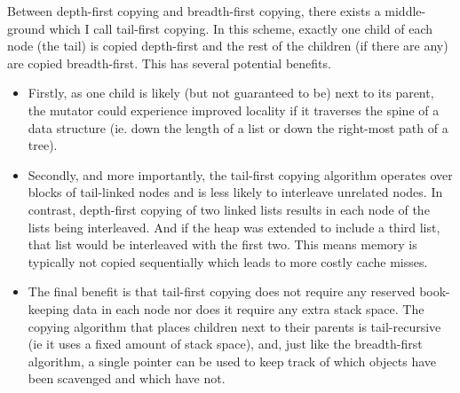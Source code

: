 \documentclass[a4paper,oneside]{memoir}
\begin{document}
Between depth-first copying and breadth-first copying, there exists a middle-ground
which I call tail-first copying. In this scheme, exactly one child of each node
(the tail) is copied depth-first and the rest of the children (if there are any)
are copied breadth-first. This has several potential benefits.
\begin{itemize}
  \item
  Firstly, as one
  child is likely (but not guaranteed to be) next to its parent, the mutator could
  experience improved locality if it traverses the spine of a data structure (ie.
  down the length of a list or down the right-most path of a tree).
  \item
  Secondly, and
  more importantly, the tail-first copying algorithm operates over blocks of
  tail-linked nodes and is less likely to interleave unrelated nodes. In contrast,
  depth-first copying of two linked lists results in each node of the lists being
  interleaved. And if the heap was extended to include a third list, that list
  would be interleaved with the first two. This means memory is typically not
  copied sequentially which leads to more costly cache misses.
  \item
  The final benefit
  is that tail-first copying does not require any reserved book-keeping data in
  each node nor does it require any extra stack space. The copying algorithm that
  places children next to their parents is tail-recursive (ie it uses a fixed
  amount of stack space), and, just like the breadth-first algorithm, a single
  pointer can be used to keep track of which objects have been scavenged and which
  have not.
\end{itemize}
\end{document}
